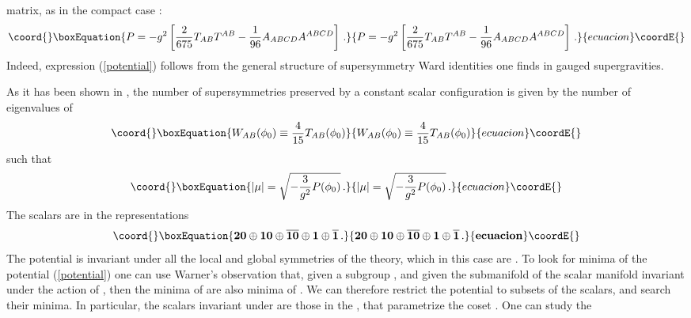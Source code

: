 \documentclass[a4paper,12pt]{article}
\def\bar{\overline}\end {picture}}
\begin{document}
matrix, as in the compact case \cite{gunwar}:
\begin{equation}\coord{}\boxEquation{
P=-g^2\left[{2\over 675}T_{AB}T^{AB}-{1\over
96}A_{ABCD}A^{ABCD}\right]\,. \label{potential}
}{
P=-g^2\left[{2\over 675}T_{AB}T^{AB}-{1\over
96}A_{ABCD}A^{ABCD}\right]\,. }{ecuacion}\coordE{}\end{equation}
Indeed, expression (\ref{potential}) follows from the general
structure of supersymmetry Ward identities one finds in gauged
supergravities.
\par
As it has been shown in \cite{gunwar}, the number of
supersymmetries preserved by a constant scalar configuration
\coordHE{} is given by the number of eigenvalues \myHighlight{$\mu$}\coordHE{} of
\begin{equation}\coord{}\boxEquation{
W_{AB}(\phi_0)\equiv {4\over 15}T_{AB}(\phi_0)
}{
W_{AB}(\phi_0)\equiv {4\over 15}T_{AB}(\phi_0)
}{ecuacion}\coordE{}\end{equation}
such that
\begin{equation}\coord{}\boxEquation{
\left|\mu\right|=\sqrt{-{3\over g^2}P(\phi_0)}\,.
}{
\left|\mu\right|=\sqrt{-{3\over g^2}P(\phi_0)}\,.
}{ecuacion}\coordE{}\end{equation}
The scalars are in the \coordHE{} representations
\begin{equation}\coord{}\boxEquation{
\bf 20\oplus 10\oplus\bar{10}\oplus 1\oplus\bar{1}\,.
}{
\bf 20\oplus 10\oplus\bar{10}\oplus 1\oplus\bar{1}\,.
}{ecuacion}\coordE{}\end{equation}
The potential is invariant under all the local and global
symmetries of the theory, which in this case are
\coordHE{}. To look for minima
of the potential (\ref{potential}) one can use Warner's
observation \cite{schur} that, given a subgroup
\coordHE{},
and given the submanifold of the scalar manifold
\coordHE{} invariant under the action of
\coordHE{}, then the minima of \coordHE{} are also minima of
\myHighlight{$\Sigma$}\coordHE{}. We can therefore restrict the potential to subsets of
the scalars, and search their minima. In particular, the scalars
invariant under \coordHE{} are those in the \coordHE{}, that
parametrize the coset \coordHE{}. One can study the
\end{document}
